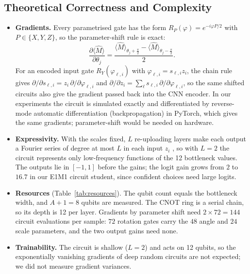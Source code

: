 \documentclass[10pt, a4paper]{article}
\begin{document}
\subsection{Theoretical Correctness and Complexity}
\begin{itemize}
    \item \textbf{Gradients.} Every parametrised gate has the form $R_P(\varphi)=e^{-i\varphi P/2}$ with $P\in\{X,Y,Z\}$, so the parameter-shift rule is exact:
    \begin{equation}
        \frac{\partial \langle \hat{M} \rangle}{\partial \theta_j} = \frac{\langle \hat{M} \rangle_{\theta_j + \frac{\pi}{2}} - \langle \hat{M} \rangle_{\theta_j - \frac{\pi}{2}}}{2}.
    \end{equation}
    For an encoded input gate $R_Y(\varphi_{\ell,i})$ with $\varphi_{\ell,i}=s_{\ell,i}z_i$, the chain rule gives $\partial/\partial s_{\ell,i}=z_i\,\partial/\partial\varphi_{\ell,i}$ and $\partial/\partial z_i=\sum_\ell s_{\ell,i}\,\partial/\partial\varphi_{\ell,i}$, so the same shifted circuits also give the gradient passed back into the CNN encoder.
    In our experiments the circuit is simulated exactly and differentiated by reverse-mode automatic differentiation (backpropagation) in PyTorch, which gives the same gradients; parameter-shift would be needed on hardware.
    \item \textbf{Expressivity.} With the scales fixed, $L$ re-uploading layers make each output a Fourier series of degree at most $L$ in each input $z_i$ \cite{schuld_expressive_2021}, so with $L=2$ the circuit represents only low-frequency functions of the 12 bottleneck values. The outputs lie in $[-1,1]$ before the gains; the logit gain grows from $2$ to $16.7$ in our E1M1 circuit student, since confident choices need large logits.
    \item \textbf{Resources} (Table~\ref{tab:resources}). The qubit count equals the bottleneck width, and $A+1=8$ qubits are measured. The CNOT ring is a serial chain, so its depth is 12 per layer. Gradients by parameter shift need $2\times72=144$ circuit evaluations per sample: $72$ rotation gates carry the $48$ angle and $24$ scale parameters, and the two output gains need none.
    \item \textbf{Trainability.} The circuit is shallow ($L=2$) and acts on 12 qubits, so the exponentially vanishing gradients of deep random circuits \cite{mcclean_barren_2018} are not expected; we did not measure gradient variances.
\end{itemize}
\end{document}
